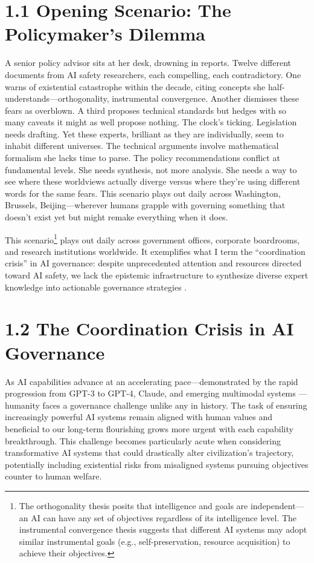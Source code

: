 \documentclass[
  11pt,
  letterpaper,
  openany]{book}
\begin{document}
\section{1.1 Opening Scenario: The Policymaker's
Dilemma}\label{opening-scenario-the-policymakers-dilemma}

A senior policy advisor sits at her desk, drowning in reports. Twelve
different documents from AI safety researchers, each compelling, each
contradictory. One warns of existential catastrophe within the decade,
citing concepts she half-understands---orthogonality, instrumental
convergence. Another dismisses these fears as overblown. A third
proposes technical standards but hedges with so many caveats it might as
well propose nothing. The clock's ticking. Legislation needs drafting.
Yet these experts, brilliant as they are individually, seem to inhabit
different universes. The technical arguments involve mathematical
formalism she lacks time to parse. The policy recommendations conflict
at fundamental levels. She needs synthesis, not more analysis. She needs
a way to see where these worldviews actually diverge versus where
they're using different words for the same fears. This scenario plays
out daily across Washington, Brussels, Beijing---wherever humans grapple
with governing something that doesn't exist yet but might remake
everything when it does.

This scenario\footnote{The orthogonality thesis posits that intelligence
  and goals are independent---an AI can have any set of objectives
  regardless of its intelligence level. The instrumental convergence
  thesis suggests that different AI systems may adopt similar
  instrumental goals (e.g., self-preservation, resource acquisition) to
  achieve their objectives.} plays out daily across government offices,
corporate boardrooms, and research institutions worldwide. It
exemplifies what I term the ``coordination crisis'' in AI governance:
despite unprecedented attention and resources directed toward AI safety,
we lack the epistemic infrastructure to synthesize diverse expert
knowledge into actionable governance strategies \textcite{todd2024}.

\section{1.2 The Coordination Crisis in AI
Governance}\label{the-coordination-crisis-in-ai-governance}

As AI capabilities advance at an accelerating pace---demonstrated by the
rapid progression from GPT-3 to GPT-4, Claude, and emerging multimodal
systems \textcite{maslej2025} \textcite{samborska2025}---humanity faces
a governance challenge unlike any in history. The task of ensuring
increasingly powerful AI systems remain aligned with human values and
beneficial to our long-term flourishing grows more urgent with each
capability breakthrough. This challenge becomes particularly acute when
considering transformative AI systems that could drastically alter
civilization's trajectory, potentially including existential risks from
misaligned systems pursuing objectives counter to human welfare.
\end{document}
